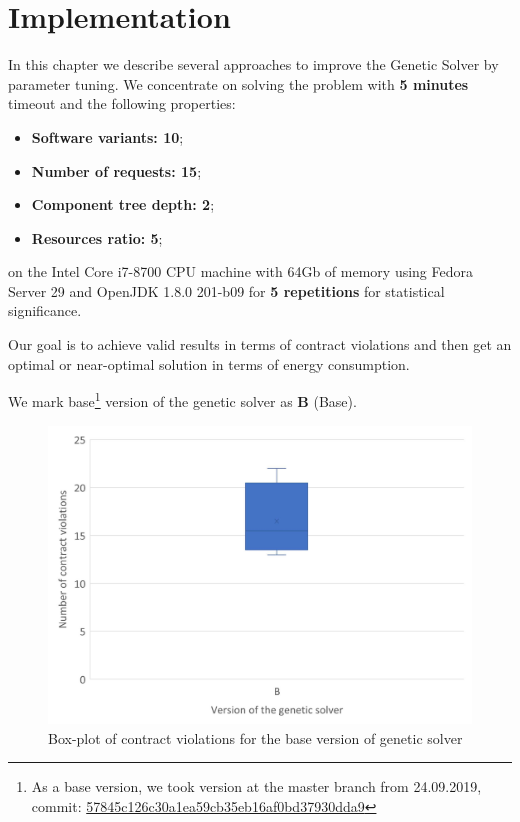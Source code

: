 \chapter{Implementation}\label{chapter:Implementation}

In this chapter we describe several approaches to improve the Genetic Solver by parameter tuning.
We concentrate on solving the problem with \textbf{5 minutes} timeout and the following properties:
\begin{itemize}
	\item \textbf{Software variants: 10};
	\item \textbf{Number of requests: 15};
	\item \textbf{Component tree depth: 2};
	\item \textbf{Resources ratio: 5};
\end{itemize}
on the Intel Core i7-8700 CPU machine with 64Gb of memory using Fedora Server 29 and OpenJDK 1.8.0 201-b09 for \textbf{5 repetitions} for statistical significance.

Our goal is to achieve valid results in terms of contract violations and then get an optimal or near-optimal solution in terms of energy consumption. 

We mark base\footnote{As a base version, we took version at the master branch from 24.09.2019, commit: \href{https://git-st.inf.tu-dresden.de/mquat/mquat2/commit/57845c126c30a1ea59cb35eb16af0bd37930dda9}{57845c126c30a1ea59cb35eb16af0bd37930dda9}} version of the genetic solver as \textbf{B} (Base).


\begin{figure}
	\centering
	\includegraphics[width=\textwidth]{images/BoxPlotSolverBasic}
	\caption[Box-plot of contract violations for the base version of genetic solver]{Box-plot of contract violations for the base version of genetic solver}
	\label{fig:boxplotsolverbasic}
\end{figure}


